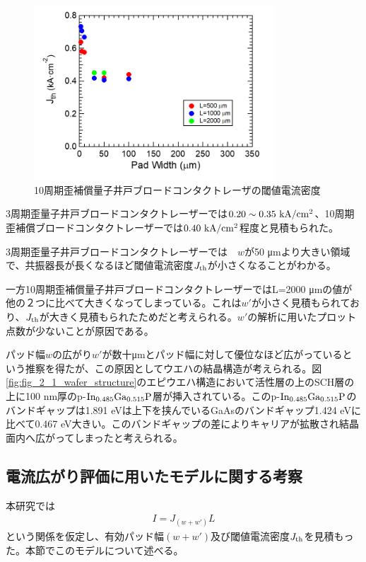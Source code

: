 \begin{figure}[ht]
	\centering
	\includegraphics[width=9cm]{figure/fig_3_1_10QW_broadcontact_Jth.png}
		\caption{10周期歪補償量子井戸ブロードコンタクトレーザの閾値電流密度}
		\label{fig:fig_3_1_10QW_broadcontact_Jth}
\end{figure}
3周期歪量子井戸ブロードコンタクトレーザーでは$0.20\sim 0.35\ \si{ \rm{  kA/cm^{2}}}$、10周期歪補償ブロードコンタクトレーザーでは$0.40\ \rm{  kA/cm^{2}}$程度と見積もられた。

3周期歪量子井戸ブロードコンタクトレーザーでは　$w$が50 \si{\micro\metre}より大きい領域で、共振器長が長くなるほど閾値電流密度$J_{\rm{th}}$が小さくなることがわかる。

一方10周期歪補償量子井戸ブロードコンタクトレーザーではL=2000 \si{\micro\metre}の値が他の２つに比べて大きくなってしまっている。これは$w'$が小さく見積もられており、$J_{\rm{th}}$が大きく見積もられたためだと考えられる。$w'$の解析に用いたプロット点数が少ないことが原因である。

パッド幅$w$の広がり$w'$が数十\si{\micro\metre}とパッド幅に対して優位なほど広がっているという推察を得たが、この原因としてウエハの結晶構造が考えられる。図\ref{fig:fig_2_1_wafer_structure}のエピウエハ構造において活性層の上のSCH層の上に100 nm厚のp-$\rm{In_{0.485}Ga_{0.515}P}$層が挿入されている。このp-$\rm{In_{0.485}Ga_{0.515}P}$のバンドギャップは1.891 eVは上下を挟んでいるGaAsのバンドギャップ1.424 eVに比べて0.467 eV大きい。このバンドギャップの差によりキャリアが拡散され結晶面内へ広がってしまったと考えられる。
\clearpage
\subsection{電流広がり評価に用いたモデルに関する考察}%
本研究では
\begin{eqnarray}
I=J_(w+w')L
\end{eqnarray}
という関係を仮定し、有効パッド幅$(w+w')$及び閾値電流密度$J_{\rm{th}}$を見積もった。本節でこのモデルについて述べる。

